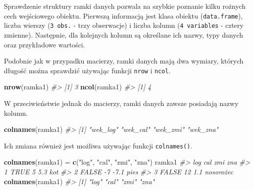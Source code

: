 \documentclass[paper=6in:9in,pagesize=pdftex,headinclude=on,footinclude=on,10pt]{scrbook}
\newenvironment{Shaded}{\begin{snugshade}}{\end{snugshade}}
\newcommand{\CommentTok}[1]{\textcolor[rgb]{0.56,0.35,0.01}{\textit{#1}}}
\newcommand{\KeywordTok}[1]{\textcolor[rgb]{0.13,0.29,0.53}{\textbf{#1}}}
\newcommand{\NormalTok}[1]{#1}
\newcommand{\StringTok}[1]{\textcolor[rgb]{0.31,0.60,0.02}{#1}}
\begin{document}
Sprawdzenie struktury ramki danych pozwala na szybkie poznanie kilku rożnych cech wejściowego obiektu.
Pierwszą informacją jest klasa obiektu (\texttt{data.frame}), liczba wierszy (\texttt{3\ obs.} - trzy obserwacje) i liczba kolumn (\texttt{4\ variables} - cztery zmienne).
Następnie, dla kolejnych kolumn są określane ich nazwy, typy danych oraz przykładowe wartości.

\begin{Shaded}
\end{Shaded}

Podobnie jak w przypadku macierzy, ramki danych mają dwa wymiary, których długość można sprawdzić używając funkcji \texttt{nrow} i \texttt{ncol}.

\begin{Shaded}
\begin{Highlighting}[]
\KeywordTok{nrow}\NormalTok{(ramka1)}
\CommentTok{#> [1] 3}
\KeywordTok{ncol}\NormalTok{(ramka1)}
\CommentTok{#> [1] 4}
\end{Highlighting}
\end{Shaded}

W przeciwieństwie jednak do macierzy, ramki danych zawsze posiadają nazwy kolumn.

\begin{Shaded}
\begin{Highlighting}[]
\KeywordTok{colnames}\NormalTok{(ramka1)}
\CommentTok{#> [1] "wek_log" "wek_cal" "wek_zmi" "wek_zna"}
\end{Highlighting}
\end{Shaded}

Ich zmiana również jest możliwa używając funkcji \texttt{colnames()}.

\begin{Shaded}
\begin{Highlighting}[]
\KeywordTok{colnames}\NormalTok{(ramka1) =}\StringTok{ }\KeywordTok{c}\NormalTok{(}\StringTok{"log"}\NormalTok{, }\StringTok{"cal"}\NormalTok{, }\StringTok{"zmi"}\NormalTok{, }\StringTok{"zna"}\NormalTok{)}
\NormalTok{ramka1}
\CommentTok{#>     log cal  zmi       zna}
\CommentTok{#> 1  TRUE   5  5.3       kot}
\CommentTok{#> 2 FALSE  -7 -7.1      pies}
\CommentTok{#> 3 FALSE  12  1.1 nosorożec}
\KeywordTok{colnames}\NormalTok{(ramka1)}
\CommentTok{#> [1] "log" "cal" "zmi" "zna"}
\end{Highlighting}
\end{Shaded}
\end{document}
